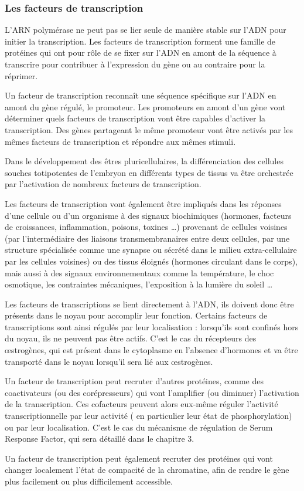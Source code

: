 \subsubsection{Les facteurs de transcription}

L'ARN polymérase ne peut pas se lier seule de manière stable sur l'ADN pour initier la transcription. 
Les facteurs de transcription forment une famille de protéines qui ont pour rôle de se fixer sur l'ADN en amont de la séquence à transcrire pour contribuer à l'expression du gène ou au contraire pour la réprimer. 

Un facteur de transcription reconnaît une séquence spécifique sur l'ADN en amont du gène régulé, le promoteur. Les promoteurs en amont d'un gène vont déterminer quels facteurs de transcription vont être capables d'activer la transcription. Des gènes partageant le même promoteur vont être activés par les mêmes facteurs de transcription et répondre aux mêmes stimuli.  

Dans le développement des êtres pluricellulaires, la différenciation des cellules souches totipotentes de l'embryon en différents types de tissus va être orchestrée par l'activation de nombreux facteurs de transcription. 

Les facteurs de transcription vont également être impliqués dans les réponses d'une cellule ou d'un organisme à des signaux biochimiques (hormones, facteurs de croissances, inflammation, poisons, toxines \dots) provenant de cellules voisines (par l'intermédiaire des liaisons transmembranaires entre deux cellules, par une structure spécialisée comme une synapse ou sécrété dans le milieu extra-cellulaire par les cellules voisines) ou des tissus éloignés (hormones circulant dans le corps), mais aussi à des signaux environnementaux comme la température, le choc osmotique, les contraintes mécaniques, l'exposition à la lumière du soleil  \dots

Les facteurs de transcriptions se lient directement à l'ADN, ils doivent donc être présents dans le noyau pour accomplir leur fonction. Certains facteurs de transcriptions sont ainsi régulés par leur localisation : lorsqu'ils sont confinés hors du noyau, ils ne peuvent pas être actifs. C'est le cas du récepteurs des \oe{}strogènes, qui est présent dans le cytoplasme en l'absence d'hormones et va être transporté dans le noyau lorsqu'il sera lié aux \oe{}strogènes.

Un facteur de transcription peut recruter d'autres protéines, comme des coactivateurs (ou des corépresseurs) qui vont l'amplifier (ou diminuer) l'activation de la transcription. Ces cofacteurs peuvent alors eux-même réguler l'activité transcriptionnelle par leur activité ( en particulier leur état de phosphorylation) ou par leur localisation. C'est le cas du mécanisme de régulation de Serum Response Factor, qui sera détaillé dans le chapitre 3. 

Un facteur de transcription peut également recruter des protéines qui vont changer localement l'état de compacité de la chromatine, afin de rendre le gène plus facilement ou plus difficilement accessible. 



%